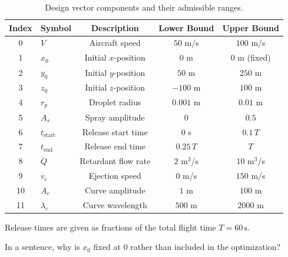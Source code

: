 \documentclass{article}
\begin{document}
\begin{enumerate}
\begin{table}[H]
\centering
\caption{Design vector components and their admissible ranges.}
\label{tab:lam}
\begin{tabular}{clccc}
\toprule
Index & Symbol & Description & Lower Bound & Upper Bound \\
\midrule
0  & $V$             & Aircraft speed              & $50$ m/s & $100$ m/s \\
1  & $x_0$           & Initial $x$-position        & $0$ m              & $0$ m (fixed)       \\
2  & $y_0$           & Initial $y$-position        & $50$ m              & $250$ m             \\
3  & $z_0$           & Initial $z$-position        & $-100$ m           & $100$ m             \\
4  & $r_p$           & Droplet radius              & $0.001$ m          & $0.01$ m            \\
5  & $A_s$           & Spray amplitude             & $0$                & $0.5$               \\
6  & $t_\text{start}$& Release start time          & $0$ s              & $0.1\,T$           \\
7  & $t_\text{end}$  & Release end time            & $0.25\,T$          & $T$                 \\
8  & $\dot{Q}$       & Retardant flow rate         & $2$ m$^3$/s        & $10$ m$^3$/s        \\
9  & $v_e$           & Ejection speed              & $0$ m/s            & $150$ m/s           \\
10 & $A_c$           & Curve amplitude             & $1$ m              & $100$ m             \\
11 & $\lambda_c$     & Curve wavelength            & $500$ m            & $2000$ m            \\
\bottomrule
\end{tabular}
\end{table}

Release times are given as fractions of the total flight time $T = 60\,\text{s}$.

In a sentence, why is $x_0$ fixed at $0$ rather than included in the optimization?

\begin{answer}
\end{answer}


\end{enumerate}
\end{document}
